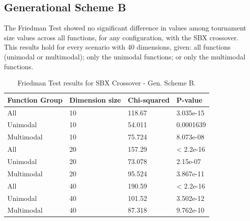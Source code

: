 \subsection{Generational Scheme B}


The Friedman Test showed no significant difference in values among tournament size values across all functions, for any configuration, with the SBX crossover. This results hold for every scenario with 40 dimensions, given: all functions (unimodal or multimodal); only the unimodal functions; or only the multimodal functions. 

\begin{table}[h]
	\centering
	\begin{tabular}{|l|l|l|l|}
		\hline
		\textbf{Function Group} & \textbf{Dimension size}      & \textbf{Chi-squared}        & \textbf{P-value}                     \\ \hline
		\multicolumn{1}{|l|}{All} & \multicolumn{1}{|l|}{10} & \multicolumn{1}{l|}{118.67} & \multicolumn{1}{l|}{3.035e-15} \\ \hline
		\multicolumn{1}{|l|}{Unimodal} & \multicolumn{1}{|l|}{10} & \multicolumn{1}{l|}{54.011} & \multicolumn{1}{l|}{0.0001639} \\ \hline
		\multicolumn{1}{|l|}{Multimodal} & \multicolumn{1}{|l|}{10} & \multicolumn{1}{l|}{75.724} & \multicolumn{1}{l|}{8.073e-08}  \\ \hline
		\hline
		\multicolumn{1}{|l|}{All} & \multicolumn{1}{|l|}{20} & \multicolumn{1}{l|}{157.29} & \multicolumn{1}{l|}{< 2.2e-16} \\ \hline
		\multicolumn{1}{|l|}{Unimodal} & \multicolumn{1}{|l|}{20} & \multicolumn{1}{l|}{73.078} & \multicolumn{1}{l|}{2.15e-07} \\ \hline
		\multicolumn{1}{|l|}{Multimodal} & \multicolumn{1}{|l|}{20} & \multicolumn{1}{l|}{95.524} & \multicolumn{1}{l|}{3.867e-11}  \\ \hline
		\hline	
		\multicolumn{1}{|l|}{All} & \multicolumn{1}{|l|}{40} & \multicolumn{1}{l|}{190.59} & \multicolumn{1}{l|}{< 2.2e-16} 						\\ \hline
		\multicolumn{1}{|l|}{Unimodal} & \multicolumn{1}{|l|}{40} & \multicolumn{1}{l|}{101.52} & \multicolumn{1}{l|}{3.502e-12} \\ \hline
		\multicolumn{1}{|l|}{Multimodal} & \multicolumn{1}{|l|}{40} & \multicolumn{1}{l|}{87.318} & \multicolumn{1}{l|}{9.762e-10}  \\ \hline
	\end{tabular}
	\caption{Friedman Test results for SBX Crossover - Gen. Scheme B.}
	\label{Friedman_test_uniform-B}	
\end{table}

